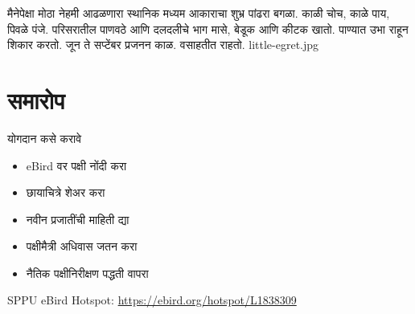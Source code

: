 \documentclass[aspectratio=169]{beamer}
\begin{document}
{मैनेपेक्षा मोठा}
{नेहमी आढळणारा स्थानिक}
{मध्यम आकाराचा शुभ्र पांढरा बगळा. काळी चोच, काळे पाय, पिवळे पंजे.}
{परिसरातील पाणवठे आणि दलदलीचे भाग}
{मासे, बेडूक आणि कीटक खातो. पाण्यात उभा राहून शिकार करतो.}
{जून ते सप्टेंबर प्रजनन काळ. वसाहतीत राहतो.}
{little-egret.jpg}

\section{समारोप}
\begin{frame}{योगदान कसे करावे}
    \begin{itemize}
        \item {\latintext eBird} वर पक्षी नोंदी करा
        \item छायाचित्रे शेअर करा
        \item नवीन प्रजातींची माहिती द्या
        \item पक्षीमैत्री अधिवास जतन करा
        \item नैतिक पक्षीनिरीक्षण पद्धती वापरा
    \end{itemize}
    \vspace{1em}
    \centering
    {\latintext SPPU eBird Hotspot:} {\latintext\url{https://ebird.org/hotspot/L1838309}}
\end{frame}
\end{document}
